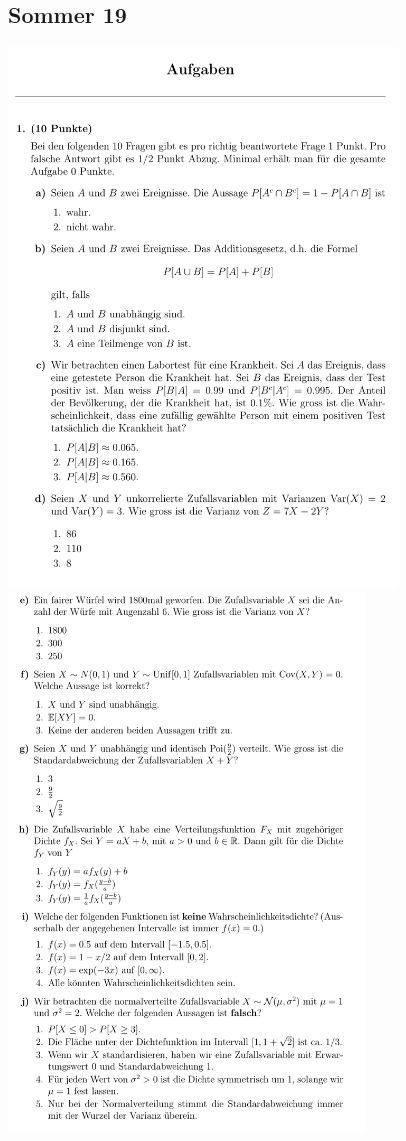 \subsection{Sommer 19}


\includegraphics[height=143mm]{old_exams_prtsrc/aufgaben/sch_infk_so19_pr-04.png}\newline
\includegraphics[height=143mm]{old_exams_prtsrc/aufgaben/sch_infk_so19_pr-05.png}\newline
